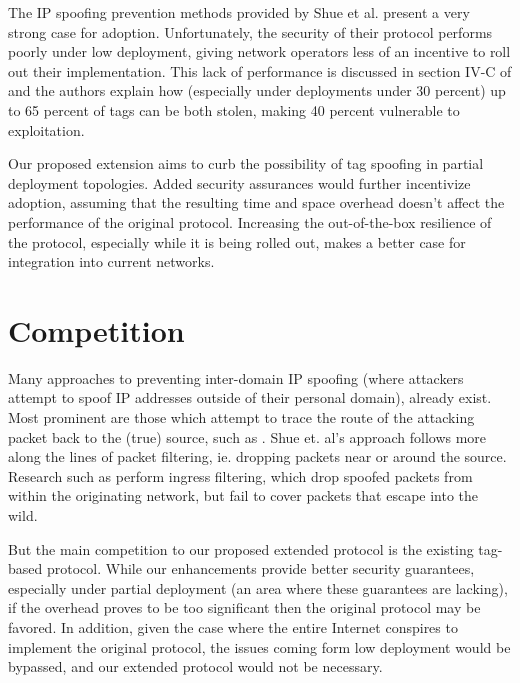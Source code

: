\documentclass[12pt]{article} %
\begin{document}
	The IP spoofing prevention methods provided by Shue et al. present a very strong case for adoption. Unfortunately, the security of their protocol performs poorly under low deployment, giving network operators less of an incentive to roll out their implementation. This lack of performance is discussed in section IV-C of \cite{Shue20081567} and the authors explain how (especially under deployments under 30 percent) up to 65 percent of tags can be both stolen, making 40 percent vulnerable to exploitation.

	Our proposed extension aims to curb the possibility of tag spoofing in partial deployment topologies. Added security assurances would further incentivize adoption, assuming that the resulting time and space overhead doesn't affect the performance of the original protocol. Increasing the out-of-the-box resilience of the protocol, especially while it is being rolled out, makes a better case for integration into current networks. 

\section{Competition} 

	Many approaches to preventing inter-domain IP spoofing (where attackers attempt to spoof IP addresses outside of their personal domain), already exist. Most prominent are those which attempt to trace the route of the attacking packet back to the (true) source, such as \cite{Taylor}. Shue et. al's approach follows more along the lines of packet filtering, ie. dropping packets near or around the source. Research such as \cite{rfc2827} perform ingress filtering, which drop spoofed packets from within the originating network, but fail to cover packets that escape into the wild.

	But the main competition to our proposed extended protocol is the existing tag-based protocol. While our enhancements provide better security guarantees, especially under partial deployment (an area where these guarantees are lacking), if the overhead proves to be too significant then the original protocol may be favored. In addition, given the case where the entire Internet conspires to implement the original protocol, the issues coming form low deployment would be bypassed, and our extended protocol would not be necessary.






\end{document}
